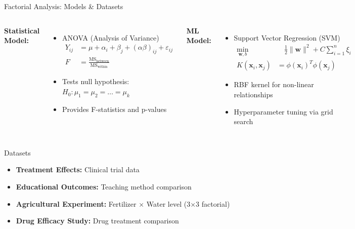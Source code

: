 \documentclass[aspectratio=169,10pt]{beamer}
\begin{document}
\begin{frame}{Factorial Analysis: Models \& Datasets}
\begin{columns}
\textcolor{statcolor}{\textbf{Statistical Model:}}
\begin{itemize}
    \item ANOVA (Analysis of Variance)
    \begin{align*}
    Y_{ij} &= \mu + \alpha_i + \beta_j + (\alpha\beta)_{ij} + \varepsilon_{ij} \\
    F &= \frac{\text{MS}_{\text{between}}}{\text{MS}_{\text{within}}}
    \end{align*}
    \item Tests null hypothesis: $H_0: \mu_1 = \mu_2 = \ldots = \mu_k$
    \item Provides F-statistics and p-values
\end{itemize}

\textcolor{mlcolor}{\textbf{ML Model:}}
\begin{itemize}
    \item Support Vector Regression (SVM)
    \begin{align*}
    \min_{\mathbf{w},b} &\quad \frac{1}{2}\|\mathbf{w}\|^2 + C\sum_{i=1}^n \xi_i \\
    K(\mathbf{x}_i, \mathbf{x}_j) &= \phi(\mathbf{x}_i)^T\phi(\mathbf{x}_j)
    \end{align*}
    \item RBF kernel for non-linear relationships
    \item Hyperparameter tuning via grid search
\end{itemize}
\end{columns}

\vspace{0.3cm}

\begin{block}{Datasets}
\begin{itemize}
    \item \textbf{Treatment Effects:} Clinical trial data
    \item \textbf{Educational Outcomes:} Teaching method comparison
    \item \textbf{Agricultural Experiment:} Fertilizer × Water level (3×3 factorial)
    \item \textbf{Drug Efficacy Study:} Drug treatment comparison
\end{itemize}
\end{block}
\end{frame}
\end{document}
